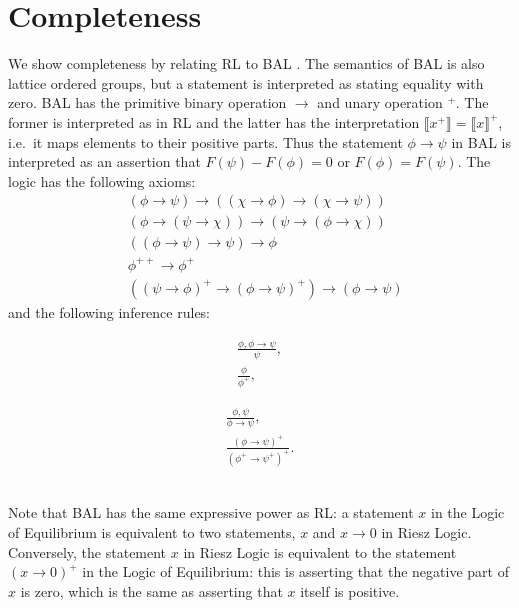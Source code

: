\documentclass[preprint,leqno]{elsarticle}
\newcommand{\interp}[1]{\llbracket #1 \rrbracket}
\begin{document}
\section{Completeness}

We show completeness by relating RL to BAL \cite{Galli:04}. The
semantics of BAL is also lattice ordered groups, but a statement is
interpreted as stating equality with zero. BAL has the primitive
binary operation $\rightarrow$ and unary operation ${}^+$. The former
is interpreted as in RL and the latter has the interpretation
$\interp{x^+} = \interp{x}^+$, i.e.~it maps elements to their positive
parts. Thus the statement $\phi \rightarrow \psi$ in BAL is
interpreted as an assertion that $F(\psi) - F(\phi) = 0$ or $F(\phi) =
F(\psi)$. The logic has the following axioms:
\begin{align}
  \tag{BALB} &(\phi \rightarrow \psi) \rightarrow ((\chi \rightarrow \phi)
  \rightarrow (\chi \rightarrow \psi))\\
  \tag{BALC} &(\phi \rightarrow (\psi \rightarrow \chi)) \rightarrow
  (\psi \rightarrow (\phi \rightarrow \chi))\\
  \tag{BALN} &((\phi \rightarrow \psi) \rightarrow \psi) \rightarrow
  \phi\\
  \tag{BALP} &\phi^{++} \rightarrow\phi^+\\
  \tag{BALO} &((\psi\rightarrow\phi)^+
  \rightarrow(\phi\rightarrow\psi)^+)\rightarrow
  (\phi\rightarrow\psi)
\end{align}
and the following inference rules:\\
\begin{minipage}{0.49\textwidth}
\begin{gather}
  \tag{BALMP} \frac{\phi, \phi \rightarrow \psi}{\psi},\\
  \tag{BALPI} \frac{\phi}{\phi^+},
\end{gather}
\end{minipage}
\begin{minipage}{0.49\textwidth}
\begin{gather}
  \tag{BALG} \frac{\phi, \psi}{\phi \rightarrow \psi},\\
  \tag{BALMI} \frac{(\phi\rightarrow\psi)^+}{(\phi^+\rightarrow\psi^+)^+}.
\end{gather}
\end{minipage}
\vspace{0.3cm}\\
Note that BAL has the same expressive power as RL: a statement $x$ in
the Logic of Equilibrium is equivalent to two statements, $x$ and
$x\rightarrow 0$ in Riesz Logic. Conversely, the statement $x$ in
Riesz Logic is equivalent to the statement $(x\rightarrow 0)^+$ in the
Logic of Equilibrium: this is asserting that the negative part of $x$
is zero, which is the same as asserting that $x$ itself is positive.
\end{document}
